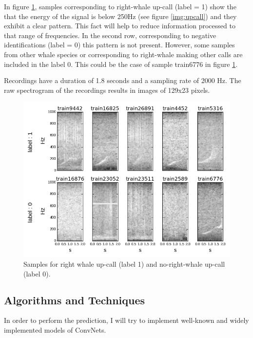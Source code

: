 \documentclass[]{article}
\begin{document}
In figure \ref{img:samples}, samples corresponding to right-whale up-call (label = 1) show the that the energy of the signal is below 250Hz (see figure \ref{img:upcall}) and they exhibit a clear pattern. This fact will help to reduce information processed to that range of frequencies. 
In the second row, corresponding to negative identifications (label = 0) this pattern is not present. However, some samples from other whale species or corresponding to right-whale making other calls are included in the label 0. This could be the case of sample train6776 in figure \ref{img:samples}.

Recordings have a duration of 1.8 seconds and a sampling rate of 2000 Hz. The raw spectrogram of the recordings results in images of 129x23 pixels.

\begin{figure}[htpb!]
\centering
\includegraphics[width= \textwidth]{./images/2_samples}
\caption{Samples for right whale up-call (label 1) and no-right-whale up-call (label 0).  \label{img:samples}}
\end{figure} 


\subsection{Algorithms and Techniques}\label{algorithms-and-techniques}

In order to perform the prediction, I will try to implement well-known and widely implemented models of ConvNets.
\end{document}
